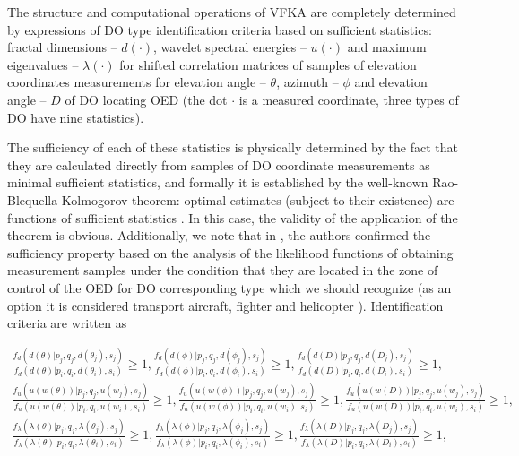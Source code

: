 The structure and computational operations of VFKA are completely determined by expressions of DO type identification criteria based on sufficient statistics: fractal dimensions -- $d(\cdot)$, wavelet spectral energies -- $u(\cdot)$ and maximum eigenvalues -- $\lambda(\cdot)$ for shifted correlation matrices of samples of elevation coordinates measurements for elevation angle -- $\theta$, azimuth -- $\phi$ and elevation angle -- $D$ of DO locating OED (the dot $\cdot$ is a measured coordinate, three types of DO have nine statistics).
 
The sufficiency of each of these statistics is physically determined by the fact that they are calculated directly from samples of DO coordinate measurements as minimal sufficient statistics, and formally it is established by the well-known Rao-Blequella-Kolmogorov theorem: optimal estimates (subject to their existence) are functions of sufficient statistics \cite{bib_07}.
In this case, the validity of the application of the theorem is obvious.
Additionally, we note that in \cite{bib_01}, the authors confirmed the sufficiency property based on the analysis of the likelihood functions of obtaining measurement samples under the condition that they are located in the zone of control of the OED for DO corresponding type which we should recognize (as an option it is considered transport aircraft, fighter and helicopter \cite{bib_08}).
Identification criteria are written as \cite{bib_01} 

\begin{equation}\label{eqn:eqn_1}
\begin{gathered}
\frac{f_d(d(\theta) | p_j, q_j, d(\theta_j), s_j)}{f_d(d(\theta) | p_i, q_i, d(\theta_i), s_i)} \ge 1,
\frac{f_d(d(\phi) | p_j, q_j, d(\phi_j), s_j)}{f_d(d(\phi) | p_i, q_i, d(\phi_i), s_i)} \ge 1,
\frac{f_d(d(D) | p_j, q_j, d(D_j), s_j)}{f_d(d(D) | p_i, q_i, d(D_i), s_i)} \ge 1, \\
\frac{f_u(u(w(\theta)) | p_j, q_j, u(w_j), s_j)}{f_u(u(w(\theta)) | p_i, q_i, u(w_i), s_i)} \ge 1,
\frac{f_u(u(w(\phi)) | p_j, q_j, u(w_j), s_j)}{f_u(u(w(\phi)) | p_i, q_i, u(w_i), s_i)} \ge 1,
\frac{f_u(u(w(D)) | p_j, q_j, u(w_j), s_j)}{f_u(u(w(D)) | p_i, q_i, u(w_i), s_i)} \ge 1, \\
\frac{f_{\lambda}(\lambda(\theta) | p_j, q_j, \lambda(\theta_j), s_j)}{f_{\lambda}(\lambda(\theta) | p_i, q_i, \lambda(\theta_i), s_i)} \ge 1,
\frac{f_{\lambda}(\lambda(\phi) | p_j, q_j, \lambda(\phi_j), s_j)}{f_{\lambda}(\lambda(\phi) | p_i, q_i, \lambda(\phi_i), s_i)} \ge 1,
\frac{f_{\lambda}(\lambda(D) | p_j, q_j, \lambda(D_j), s_j)}{f_{\lambda}(\lambda(D) | p_i, q_i, \lambda(D_i), s_i)} \ge 1,
\end{gathered}
\end{equation}
 

